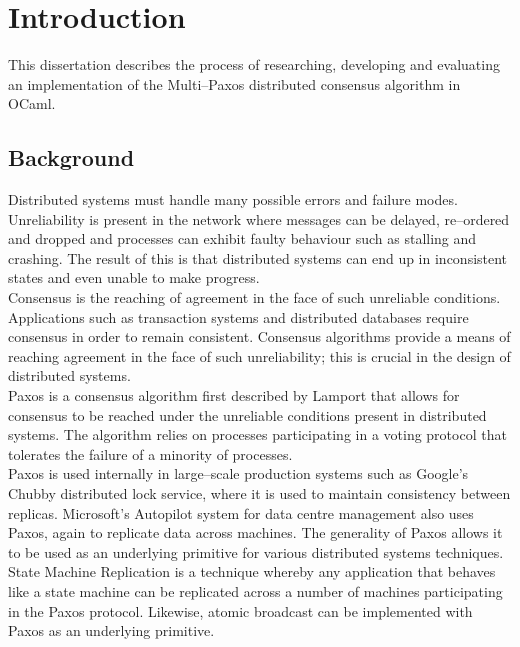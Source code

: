\chapter{Introduction}

This dissertation describes the process of researching, developing and evaluating an implementation of the Multi--Paxos distributed consensus algorithm in OCaml.

\section{Background}

Distributed systems must handle many possible errors and failure modes. Unreliability is present in the network where messages can be delayed, re--ordered and dropped and processes can exhibit faulty behaviour such as stalling and crashing. The result of this is that distributed systems can end up in inconsistent states and even unable to make progress. \\

Consensus is the reaching of agreement in the face of such unreliable conditions. Applications such as transaction systems and distributed databases require consensus in order to remain consistent. Consensus algorithms provide a means of reaching agreement in the face of such unreliability; this is crucial in the design of distributed systems. \\

Paxos is a consensus algorithm first described by Lamport \cite{Lamport:1998:PP:279227.279229} that allows for consensus to be reached under the unreliable conditions present in distributed systems. The algorithm relies on processes participating in a voting protocol that tolerates the failure of a minority of processes. \\

Paxos is used internally in large--scale production systems such as Google's Chubby \cite{Burrows:2006:CLS:1298455.1298487} distributed lock service, where it is used to maintain consistency between replicas. Microsoft's Autopilot \cite{autopilot-automatic-data-center-management} system for data centre management also uses Paxos, again to replicate data across machines. The generality of Paxos allows it to be used as an underlying primitive for various distributed systems techniques. State Machine Replication \cite{Schneider:1990:IFS:98163.98167} is a technique whereby any application that behaves like a state machine can be replicated across a number of machines participating in the Paxos protocol. Likewise, atomic broadcast \cite{Rodrigues:2003:ABA:942591.942742} can be implemented with Paxos as an underlying primitive. \\

